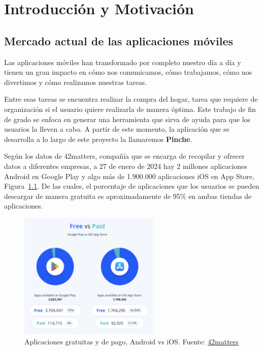 \cleardoublepage
\chapter{Introducción y Motivación}
\label{sec:intro} %


\section{Mercado actual de las aplicaciones móviles}

Las aplicaciones móviles han transformado por completo nuestro día  a día y tienen un gran impacto en cómo nos comunicamos, cómo trabajamos, cómo nos divertimos y cómo realizamos nuestras tareas.

Entre esas tareas se encuentra realizar la compra del hogar, tarea que requiere de organización si el usuario quiere realizarla de manera óptima. Este trabajo de fin de grado se enfoca en generar una herramienta que sirva de ayuda para que los usuarios la lleven a cabo. A partir de este momento, la aplicación que se desarrolla a lo largo de este proyecto la llamaremos \textbf{Pinche}.

Según los datos de 42matters, compañía que se encarga de recopilar y ofrecer datos a diferentes empresas, a 27 de enero de 2024 hay 2 millones aplicaciones Android en Google Play y algo más de 1.900.000 aplicaciones iOS en App Store, Figura~\ref{fig:apps_free_vs_pay}. De las cuales, el porcentaje de aplicaciones que los usuarios se pueden descargar de manera gratuita es aproximadamente de 95\% en ambas tiendas de aplicaciones.

\begin{figure}[H]
\centering
\includegraphics[width=0.6\textwidth]{./img/intro/apps_free_vs_pay.png}
\caption{Aplicaciones gratuitas y de pago, Android vs iOS. Fuente: \href{https://42matters.com/stats\#available-apps-count}{42matters}}
\label{fig:apps_free_vs_pay}
\end{figure}

